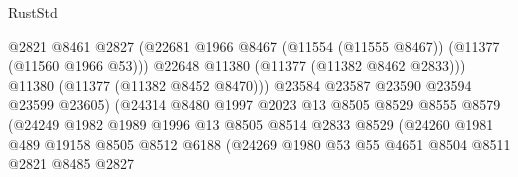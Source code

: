 \begin{lexlean}{RustStd}
\begin{coremodule}
                                          @2821
                                          @8461
                                          @2827
                                          (@22681
                                            @1966
                                            @8467
                                            (@11554 (@11555 @8467))
                                            (@11377 (@11560 @1966 @53)))
                                          @22648
                                          @11380
                                          (@11377 (@11382 @8462 @2833)))
                                        @11380
                                        (@11377 (@11382 @8452 @8470)))
                                      @23584
                                      @23587
                                      @23590
                                      @23594
                                      @23599
                                      @23605)
                                    (@24314
                                      @8480
                                      @1997
                                      @2023
                                      @13
                                      @8505
                                      @8529
                                      @8555
                                      @8579
                                      (@24249
                                        @1982
                                        @1989
                                        @1996
                                        @13
                                        @8505
                                        @8514
                                        @2833
                                        @8529
                                        (@24260
                                          @1981
                                          @489
                                          @19158
                                          @8505
                                          @8512
                                          @6188
                                          (@24269
                                            @1980
                                            @53
                                            @55
                                            @4651
                                            @8504
                                            @8511
                                            @2821
                                            @8485
                                            @2827

\end{coremodule}
\end{lexlean}
